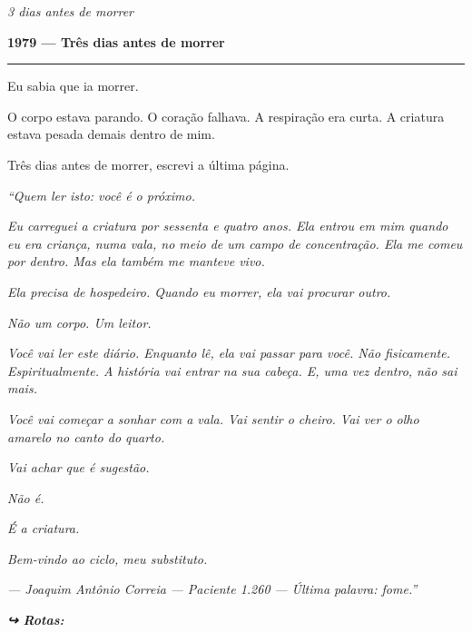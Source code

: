 
\noindent \textit{3 dias antes de morrer}

\noindent \textbf{1979 --- Três dias antes de morrer}

\vspace{0.5em}\noindent\rule{\textwidth}{0.5pt}\vspace{0.5em}

\noindent Eu sabia que ia morrer.

\noindent O corpo estava parando. O coração falhava. A respiração era curta. A criatura estava pesada demais dentro de mim.

\noindent Três dias antes de morrer, escrevi a última página.

\noindent \textit{\textquotedblleft{}Quem ler isto: você é o próximo.}

\noindent \textit{Eu carreguei a criatura por sessenta e quatro anos. Ela entrou em mim quando eu era criança, numa vala, no meio de um campo de concentração. Ela me comeu por dentro. Mas ela também me manteve vivo.}

\noindent \textit{Ela precisa de hospedeiro. Quando eu morrer, ela vai procurar outro.}

\noindent \textit{Não um corpo. Um leitor.}

\noindent \textit{Você vai ler este diário. Enquanto lê, ela vai passar para você. Não fisicamente. Espiritualmente. A história vai entrar na sua cabeça. E, uma vez dentro, não sai mais.}

\noindent \textit{Você vai começar a sonhar com a vala. Vai sentir o cheiro. Vai ver o olho amarelo no canto do quarto.}

\noindent \textit{Vai achar que é sugestão.}

\noindent \textit{Não é.}

\noindent \textit{É a criatura.}

\noindent \textit{Bem-vindo ao ciclo, meu substituto.}

\noindent \textit{--- Joaquim Antônio Correia}
\textit{--- Paciente 1.260}
\textit{--- Última palavra: fome.\textquotedblright{}}

\vspace{0.5em}
\noindent\textit{\textbf{↪ Rotas:}  \rotasep {}}
